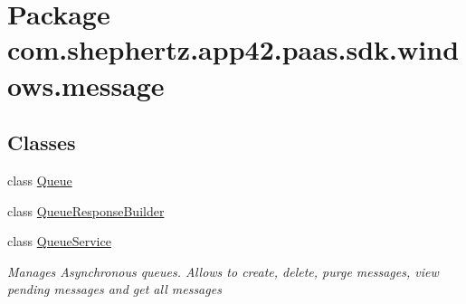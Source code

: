 \hypertarget{namespacecom_1_1shephertz_1_1app42_1_1paas_1_1sdk_1_1windows_1_1message}{\section{Package com.\+shephertz.\+app42.\+paas.\+sdk.\+windows.\+message}
\label{namespacecom_1_1shephertz_1_1app42_1_1paas_1_1sdk_1_1windows_1_1message}
}
\subsection*{Classes}
\begin{DoxyCompactItemize}
\item 
class \hyperlink{classcom_1_1shephertz_1_1app42_1_1paas_1_1sdk_1_1windows_1_1message_1_1_queue}{Queue}
\item 
class \hyperlink{classcom_1_1shephertz_1_1app42_1_1paas_1_1sdk_1_1windows_1_1message_1_1_queue_response_builder}{Queue\+Response\+Builder}
\item 
class \hyperlink{classcom_1_1shephertz_1_1app42_1_1paas_1_1sdk_1_1windows_1_1message_1_1_queue_service}{Queue\+Service}
\begin{DoxyCompactList}\small\item\em Manages Asynchronous queues. Allows to create, delete, purge messages, view pending messages and get all messages \end{DoxyCompactList}\end{DoxyCompactItemize}
